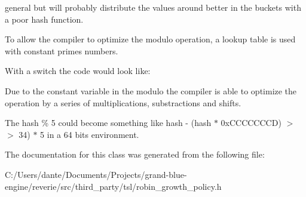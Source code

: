 general but will probably distribute the values around better in the buckets with a poor hash function.

To allow the compiler to optimize the modulo operation, a lookup table is used with constant primes numbers.

With a switch the code would look like\+: 
\begin{DoxyCode}{0}
\DoxyCodeLine{            \textcolor{keywordflow}{break};}
\DoxyCodeLine{            \textcolor{keywordflow}{break};}
\DoxyCodeLine{            \textcolor{keywordflow}{break};}
\DoxyCodeLine{\}    }
\end{DoxyCode}


Due to the constant variable in the modulo the compiler is able to optimize the operation by a series of multiplications, substractions and shifts.

The \textquotesingle{}hash \% 5\textquotesingle{} could become something like \textquotesingle{}hash -\/ (hash $\ast$ 0x\+C\+C\+C\+C\+C\+C\+CD) $>$$>$ 34) $\ast$ 5\textquotesingle{} in a 64 bits environment. 

The documentation for this class was generated from the following file\+:\begin{DoxyCompactItemize}
\item 
C\+:/\+Users/dante/\+Documents/\+Projects/grand-\/blue-\/engine/reverie/src/third\+\_\+party/tsl/robin\+\_\+growth\+\_\+policy.\+h\end{DoxyCompactItemize}

